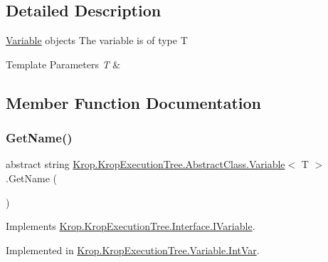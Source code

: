 \subsection{Detailed Description}
\mbox{\hyperlink{class_krop_1_1_krop_execution_tree_1_1_abstract_class_1_1_variable}{Variable}} objects The variable is of type T 


\begin{DoxyTemplParams}{Template Parameters}
{\em T} & \\
\hline
\end{DoxyTemplParams}


\subsection{Member Function Documentation}
\mbox{\label{class_krop_1_1_krop_execution_tree_1_1_abstract_class_1_1_variable_a987550c24ebd0ceb01aec0b6edf51dfb}} 
\subsubsection{\texorpdfstring{Get\+Name()}{GetName()}}
{\footnotesize\ttfamily abstract string \mbox{\hyperlink{class_krop_1_1_krop_execution_tree_1_1_abstract_class_1_1_variable}{Krop.\+Krop\+Execution\+Tree.\+Abstract\+Class.\+Variable}}$<$ T $>$.Get\+Name (\begin{DoxyParamCaption}{ }\end{DoxyParamCaption})\hspace{0.3cm}{\ttfamily [pure virtual]}}



Implements \mbox{\hyperlink{interface_krop_1_1_krop_execution_tree_1_1_interface_1_1_i_variable_a0a1ca374f3af72c44d0754c00e8c26d3}{Krop.\+Krop\+Execution\+Tree.\+Interface.\+I\+Variable}}.



Implemented in \mbox{\hyperlink{class_krop_1_1_krop_execution_tree_1_1_variable_1_1_int_var_ae48d754976bd6ed849a048ae209a689a}{Krop.\+Krop\+Execution\+Tree.\+Variable.\+Int\+Var}}.

\mbox{\label{class_krop_1_1_krop_execution_tree_1_1_abstract_class_1_1_variable_a9d77d99b187893c15c5847ffa6fe0daf}} 
